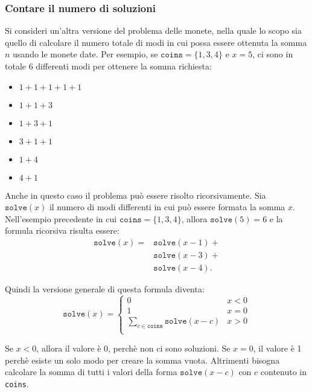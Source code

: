 \subsubsection{Contare il numero di soluzioni}

Si consideri un'altra versione del problema delle monete,
nella quale lo scopo sia quello di calcolare
il numero totale di modi in cui possa essere 
ottenuta la somma $n$ usando le monete date.
Per esempio, se $\texttt{coins}=\{1,3,4\}$ e
$x=5$, ci sono in totale 6 differenti modi per ottenere la somma richiesta:

\begin{multicols}{2}
\begin{itemize}
\item $1+1+1+1+1$
\item $1+1+3$
\item $1+3+1$
\item $3+1+1$
\item $1+4$
\item $4+1$
\end{itemize}
\end{multicols}

Anche in questo caso il problema può essere risolto ricorsivamente.
Sia $\texttt{solve}(x)$ il numero di modi differenti in cui può
essere formata la somma $x$.
Nell'esempio precedente in cui $\texttt{coins}=\{1,3,4\}$,
allora $\texttt{solve}(5)=6$ e la formula ricorsiva risulta essere:
\begin{equation*}
\begin{split}
\texttt{solve}(x) = & \texttt{solve}(x-1) + \\
                    & \texttt{solve}(x-3) + \\
                    & \texttt{solve}(x-4)  .
\end{split}
\end{equation*}

Quindi la versione generale di questa formula diventa:
\begin{equation*}
    \texttt{solve}(x) = \begin{cases}
               0               & x < 0\\
               1               & x = 0\\
               \sum_{c \in \texttt{coins}} \texttt{solve}(x-c) & x > 0 \\
           \end{cases}
\end{equation*}

Se $x<0$, allora il valore è 0, perchè non ci sono soluzioni.
Se $x=0$, il valore è 1 perchè esiste un solo modo 
per creare la somma vuota.
Altrimenti bisogna calcolare la somma di tutti i valori
della forma $\texttt{solve}(x-c)$ con $c$ contenuto in \texttt{coins}.

